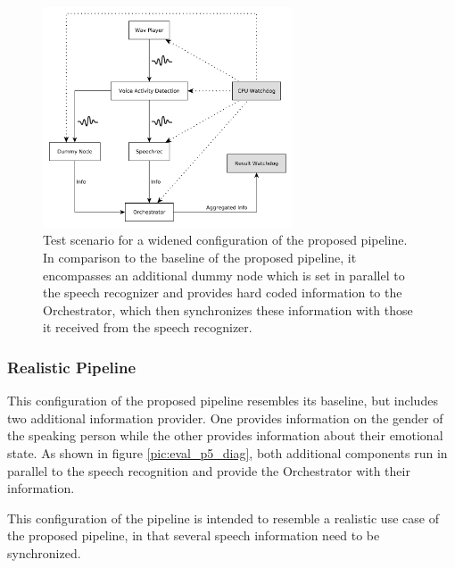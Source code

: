 \begin{figure}[]
	\centering
	\includegraphics[width=0.66\textwidth]{diagrams/eval_pipeline_3.pdf}
	\caption{Test scenario for a widened configuration of the proposed pipeline.
		In comparison to the baseline of the proposed pipeline, it encompasses an additional dummy node which is set in parallel to the speech recognizer and provides hard coded information to the Orchestrator, which then synchronizes these information with those it received from the speech recognizer.}
	\label{pic:eval_p3_diag}
\end{figure}


\subsubsection{Realistic Pipeline}
This configuration of the proposed pipeline resembles its baseline, but includes two additional information provider. 
One provides information on the gender of the speaking person while the other provides information about their emotional state.
As shown in figure \ref{pic:eval_p5_diag}, both additional components run in parallel to the speech recognition and provide the Orchestrator with their information.

This configuration of the pipeline is intended to resemble a realistic use case of the proposed pipeline, in that several speech information need to be synchronized.

